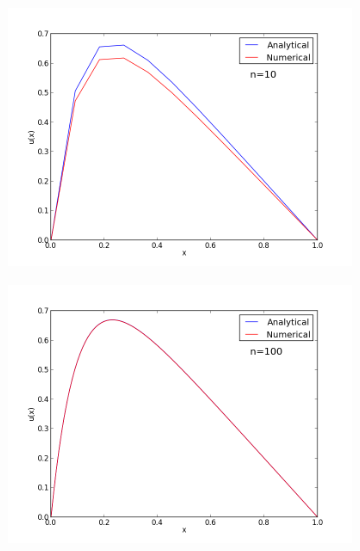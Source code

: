 \documentclass[12pt, a4paper]{article}
\begin{document}
\begin{figure}[ht!]
  \centering
  \begin{subfigure}[b]{0.495\textwidth}
		\includegraphics[width=\textwidth]{../Program/plot_n_10.png}
  \end{subfigure}
  \begin{subfigure}[b]{0.495\textwidth}
        \includegraphics[width=\textwidth]{../Program/plot_n_100.png}
  \end{subfigure}
  \begin{subfigure}[b]{0.495\textwidth}

\end{subfigure}
\end{figure}
\end{document}

